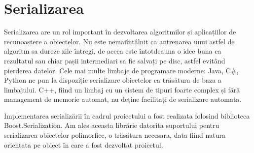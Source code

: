 \section{Serializarea}

Serializarea are un rol important în dezvoltarea algoritmilor și aplicațiilor de recunoaștere a obiectelor.
Nu este nemaiîntâlnit ca antrenarea unui astfel de algoritm sa dureze zile întregi, de aceea este întotdeauna o idee buna ca rezultatul sau chiar pașii intermediari sa fie salvați pe disc, astfel evitând pierderea datelor.
Cele mai multe limbaje de programare moderne: Java, C\#, Python ne pun la dispoziție serializare obiectelor ca trăsătura de baza a limbajului.
C++, fiind un limbaj cu un sistem de tipuri foarte complex și fără management de memorie automat, nu deține facilitați de serializare automata.

Implementarea serializării în cadrul proiectului a fost realizata folosind biblioteca Boost.Serialization.
Am ales aceasta librărie datorita suportului pentru serializarea obiectelor polimorfice, o trăsătura necesara, data fiind natura orientata pe obiect în care a fost dezvoltat proiectul.

\pagebreak